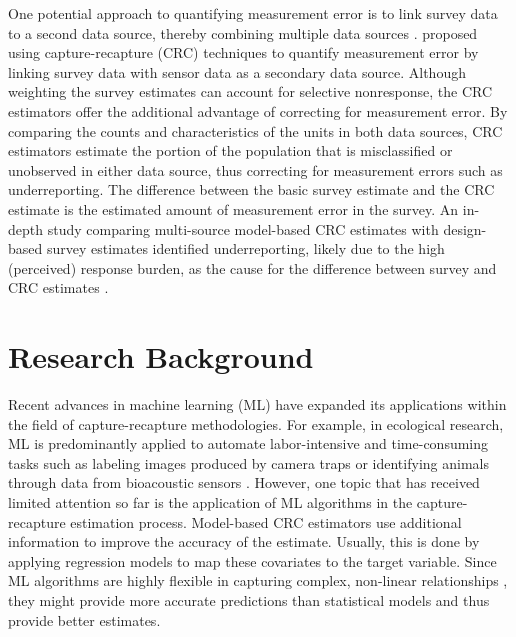 \documentclass[12pt, a4paper]{article}
\begin{document}
One potential approach to quantifying measurement error is to link survey data to a second data source, thereby combining multiple data sources \parencite{lohr2017datasources}. \textcite{klingwort2019CRC} proposed using capture-recapture (CRC) techniques to quantify measurement error by linking survey data with sensor data as a secondary data source. Although weighting the survey estimates can account for selective nonresponse, the CRC estimators offer the additional advantage of correcting for measurement error. By comparing the counts and characteristics of the units in both data sources, CRC estimators estimate the portion of the population that is misclassified or unobserved in either data source, thus correcting for measurement errors such as underreporting. The difference between the basic survey estimate and the CRC estimate is the estimated amount of measurement error in the survey. An in-depth study comparing multi-source model-based CRC estimates with design-based survey estimates identified underreporting, likely due to the high (perceived) response burden, as the cause for the difference between survey and CRC estimates \parencite{klingwort2021transition}. 

\section{Research Background}
\noindent Recent advances in machine learning (ML) have expanded its applications within the field of capture-recapture methodologies. For example, in ecological research, ML is predominantly applied to automate labor-intensive and time-consuming tasks such as labeling images produced by camera traps \parencite{whytock2021robust, green2020spatially} or identifying animals through data from bioacoustic sensors \parencite{wang2024statistical}. However, one topic that has received limited attention so far is the application of ML algorithms in the capture-recapture estimation process. Model-based CRC estimators use additional information to improve the accuracy of the estimate. Usually, this is done by applying regression models to map these covariates to the target variable. Since ML algorithms are highly flexible in capturing complex, non-linear relationships \parencite{boulesteix2014machine}, they might provide more accurate predictions than statistical models and thus provide better estimates. \par
\end{document}
